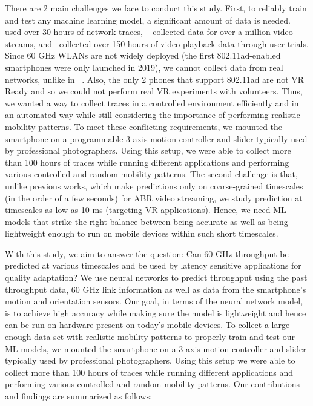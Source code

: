 \documentclass[sigconf,anonymous]{acmart}
\begin{document}
There are 2 main challenges we face to conduct this study. First, to
reliably train and test any machine learning model, a significant
amount of data is needed.~\cite{mao:sigcomm2017} used over 30 hours of
network traces, ~\cite{yan:nsdi2020} collected data for over a million
video streams, and~\cite{xu:conext2017} collected over 150 hours of
video playback data through user trials. Since 60 GHz WLANs are not
widely deployed (the first 802.11ad-enabled smartphones were only
launched in 2019), we cannot collect data from real networks, unlike
in ~\cite{mao:sigcomm2017,yan:nsdi2020}. Also, the only 2 phones that
support 802.11ad are not VR Ready and so we could not perform real VR
experiments with volunteers. Thus, we wanted a way to collect
traces in a controlled environment efficiently and in an automated way
while still considering the importance of performing realistic
mobility patterns. To meet these conflicting requirements, we mounted
the smartphone on a programmable 3-axis motion controller and slider
typically used by professional photographers. Using this setup, we
were able to collect more than 100 hours of traces while running
different applications and performing various controlled and random
mobility patterns. The second challenge is that, unlike previous
works, which make predictions only on coarse-grained timescales (in
the order of a few seconds) for ABR video streaming, we study prediction at
timescales as low as 10 ms (targeting VR applications). Hence, we need
ML models that strike the right balance between being accurate as well
as being lightweight enough to run on mobile devices within such short
timescales.

With this study, we aim to answer the question: Can 60 GHz throughput be predicted at various timescales and be used by latency sensitive applications for quality adaptation? We use neural networks to predict throughput using the past throughput data, 60 GHz link information as well as data from the smartphone's motion and orientation sensors. Our goal, in terms of the neural network model, is to achieve high accuracy while making sure the model is lightweight and hence can be run on hardware present on today's mobile devices. To collect a large enough data set with realistic mobility patterns to properly train and test our ML models, we mounted the smartphone on a 3-axis motion controller and slider typically used by professional photographers. Using this setup we were able to collect more than 100 hours of traces while running different applications and performing various controlled and random mobility patterns. 
\fi
Our contributions and findings are summarized as follows:
\end{document}
